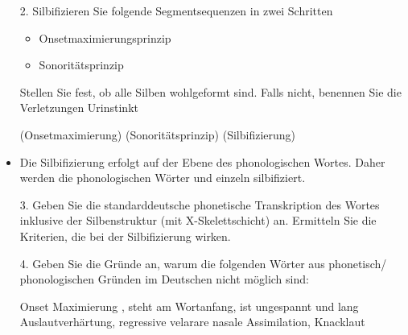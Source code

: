 {\begin{frame}
	\begin{itemize}
		\item[2.] Silbifizieren Sie folgende Segmentsequenzen in zwei Schritten
			\begin{itemize}
				\item Onsetmaximierungsprinzip
				\item Sonoritätsprinzip
			\end{itemize}
			
		Stellen Sie fest, ob alle Silben wohlgeformt sind. Falls nicht, benennen Sie die Verletzungen	
		\ea
		Urinstinkt
		\z
		
		\eal
		\ex \textipa{[Pu.\;RI.nStInkt]} (Onsetmaximierung)
		\ex {} (Sonoritätsprinzip)
		\ex {} (Silbifizierung)
		\zl 
		\item Die Silbifizierung erfolgt auf der Ebene des phonologischen Wortes. Daher werden die phonologischen Wörter  und  einzeln silbifiziert.
	
	\end{itemize}
\end{frame}


\begin{frame}
	\begin{itemize}	
		\item[3.] Geben Sie die standarddeutsche phonetische Transkription des Wortes  inklusive der Silbenstruktur (mit X-Skelettschicht) an. Ermitteln Sie die Kriterien, die bei der Silbifizierung wirken.
			
		\end{itemize}
\end{frame}


\begin{frame}
	\begin{itemize}
					
		\item[4.] Geben Sie die Gründe an, warum die folgenden Wörter aus phonetisch/ phonologischen Gründen im Deutschen nicht möglich sind:
			
		\eal
		\ex[*]{\textipa{['Napl.O:t]}} Onset Maximierung \textipa{[pl]}, \textipa{[N]} steht am Wortanfang, \textipa{[O]} ist ungespannt und lang
		\ex[*]{\textipa{[a\;R.'tUng]}} Auslautverhärtung, regressive velarare nasale Assimilation, Knacklaut
		\zl
			
	\end{itemize}
		
\end{frame}
	
}


